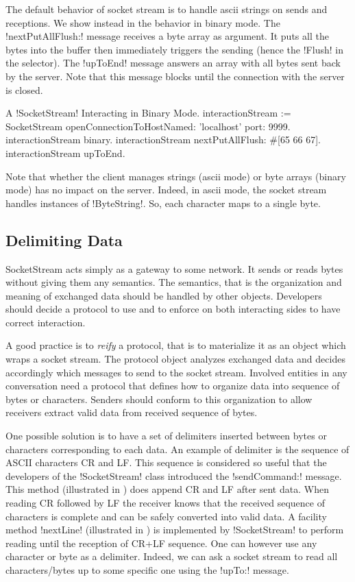 \documentclass[a4paper,10pt,twoside]{book}
\begin{document}
The default behavior of socket stream is to handle ascii strings on sends and receptions.
We show instead in  the behavior in binary mode.
The \ct!nextPutAllFlush:! message receives a byte array as argument.
It puts all the bytes into the buffer then immediately triggers the sending (hence the \ct!Flush! in the selector).
The \ct!upToEnd! message answers an array with all bytes sent back by the server.
Note that this message blocks until the connection with the server is closed.


\begin{script}{A \ct!SocketStream! Interacting in Binary Mode.}
interactionStream := SocketStream 
									openConnectionToHostNamed: 'localhost' port: 9999.  
interactionStream binary.
interactionStream nextPutAllFlush: #[65 66 67].
interactionStream upToEnd.
\end{script}

Note that whether the client manages strings (ascii mode) or byte arrays (binary mode) has no impact on the server.
Indeed, in ascii mode, the socket stream handles instances of \ct!ByteString!.
So, each character maps to a single byte. 

\subsection{Delimiting Data}
SocketStream acts simply as a gateway to some network. 
It sends or reads bytes without giving them any semantics.
The semantics, that is the organization and meaning of exchanged data should be handled by other objects.
Developers should decide a protocol to use and to enforce on both interacting sides to have correct interaction.

A good practice is to \emph{reify} a protocol, that is to materialize it as an object which wraps a socket stream. 
The protocol object analyzes exchanged data and decides accordingly which messages to send to the socket stream.
Involved entities in any conversation need a protocol that defines how to organize data into sequence of bytes or characters.
Senders should conform to this organization to allow receivers extract valid data from received sequence of bytes.
 
One possible solution is to have a set of delimiters inserted between bytes or characters corresponding to each data.
An example of delimiter is the sequence of ASCII characters CR and LF.
This sequence is considered so useful that the developers of the \ct!SocketStream! class introduced the \ct!sendCommand:! message.
This method (illustrated in ) does append CR and LF after sent data.
When reading CR followed by LF the receiver knows that the received sequence of characters is complete and can be safely converted into valid data.
A facility method \ct!nextLine! (illustrated in ) is implemented by \ct!SocketStream! to perform reading until the reception of CR+LF sequence.
One can however use any character or byte as a delimiter.
Indeed, we can ask a socket stream to read all characters/bytes up to some specific one using the \ct!upTo:! message.
\end{document}
